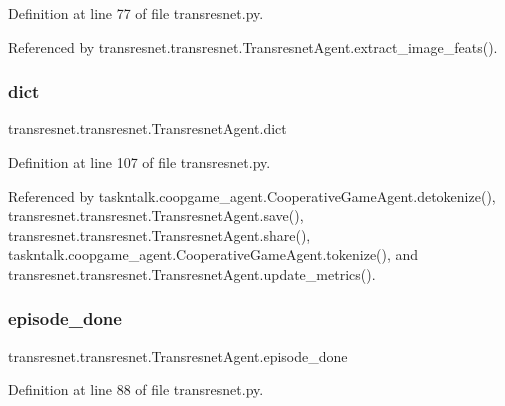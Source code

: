 Definition at line 77 of file transresnet.\+py.



Referenced by transresnet.\+transresnet.\+Transresnet\+Agent.\+extract\+\_\+image\+\_\+feats().

\mbox{\label{classtransresnet_1_1transresnet_1_1TransresnetAgent_a82eb333981adfa8b0fcc7faefe293c30}} 
\subsubsection{\texorpdfstring{dict}{dict}}
{\footnotesize\ttfamily transresnet.\+transresnet.\+Transresnet\+Agent.\+dict}



Definition at line 107 of file transresnet.\+py.



Referenced by taskntalk.\+coopgame\+\_\+agent.\+Cooperative\+Game\+Agent.\+detokenize(), transresnet.\+transresnet.\+Transresnet\+Agent.\+save(), transresnet.\+transresnet.\+Transresnet\+Agent.\+share(), taskntalk.\+coopgame\+\_\+agent.\+Cooperative\+Game\+Agent.\+tokenize(), and transresnet.\+transresnet.\+Transresnet\+Agent.\+update\+\_\+metrics().

\mbox{\label{classtransresnet_1_1transresnet_1_1TransresnetAgent_aa7e84e53e81b7cca3aaf3ee7c22f049c}} 
\subsubsection{\texorpdfstring{episode\+\_\+done}{episode\_done}}
{\footnotesize\ttfamily transresnet.\+transresnet.\+Transresnet\+Agent.\+episode\+\_\+done}



Definition at line 88 of file transresnet.\+py.



